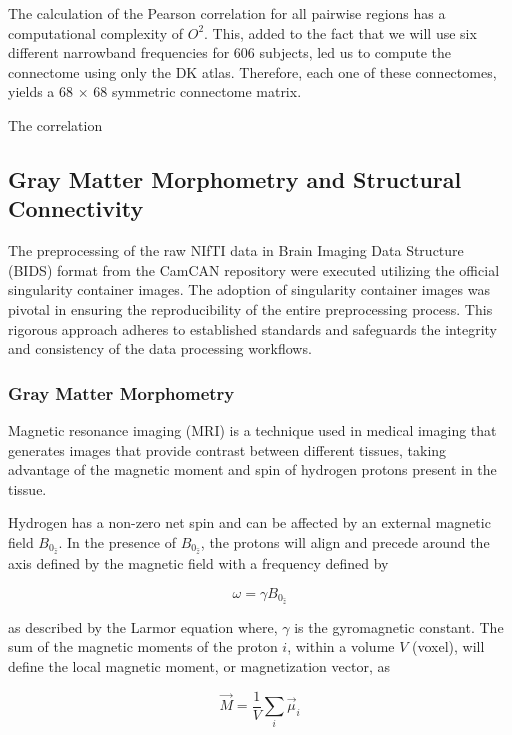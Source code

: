 \documentclass{cys}
\begin{document}
\bigskip
The calculation of the Pearson correlation for all pairwise regions has a computational complexity of $O^2$. This, added to the fact that we will use six different narrowband frequencies for 606 subjects, led us to compute the connectome using only the DK atlas. Therefore, each one of these connectomes, yields a 68 $\times$ 68 symmetric connectome matrix.

\bigskip
The correlation 
\subsection{Gray Matter Morphometry and Structural Connectivity}

The preprocessing of the raw NIfTI data in Brain Imaging Data Structure (BIDS) format from the CamCAN repository were executed utilizing the official singularity container images. The adoption of singularity container images was pivotal in ensuring the reproducibility of the entire preprocessing process. This rigorous approach adheres to established standards and safeguards the integrity and consistency of the data processing workflows.

\bigskip
\subsubsection{Gray Matter Morphometry}

Magnetic resonance imaging (MRI) is a technique used in medical imaging that generates images that provide contrast between different tissues, taking advantage of the magnetic moment and spin of hydrogen protons present in the tissue.

Hydrogen has a non-zero net spin and can be affected by an external magnetic field $B_{0_{\hat{z}}}$. In the presence of $B_{0_{\hat{z}}}$, the protons will align and precede around the axis defined by the magnetic field with a frequency defined by

\begin{equation}
\omega = \gamma B_{0_{\hat{z}}}
\end{equation}

as described by the Larmor equation where, $\gamma$ is the gyromagnetic constant. The sum of the magnetic moments of the proton $i$, within a volume $V$ (voxel), will define the local magnetic moment, or magnetization vector, as

\begin{equation}
\vec{M} = \frac{1}{V} \sum_i \vec{\mu}_i
\end{equation}
\end{document}
